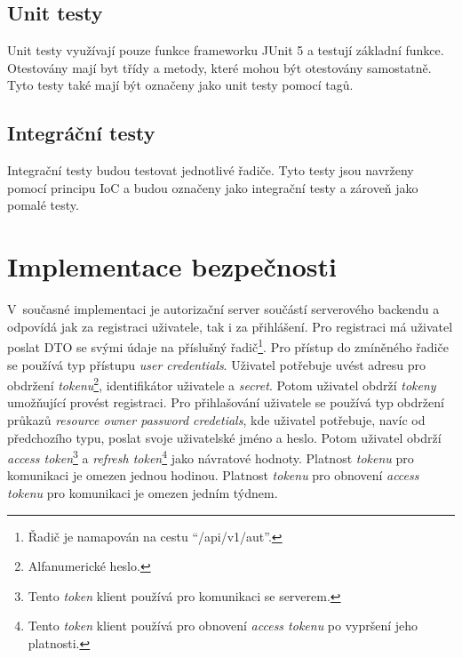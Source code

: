     \subsection{Unit testy}
        Unit testy využívají pouze funkce frameworku JUnit 5 a testují základní funkce. Otestovány mají byt třídy a metody, které mohou být otestovány samostatně. Tyto testy také mají být označeny jako unit testy pomocí tagů.
        
    \subsection{Integráční testy}
        Integrační testy budou testovat jednotlivé řadiče. Tyto testy jsou navrženy pomocí principu IoC a budou označeny jako integrační testy a zároveň jako pomalé testy.

\section{Implementace bezpečnosti}
        V~současné implementaci je autorizační server součástí serverového backendu a odpovídá jak za registraci uživatele, tak i za přihlášení. Pro registraci má uživatel poslat DTO se svými údaje na příslušný řadič\footnote{Řadič je namapován na cestu \enquote{/api/v1/aut}.}. Pro přístup do zmíněného řadiče se používá typ přístupu \textit{user credentials}. Uživatel potřebuje uvést adresu pro obdržení \textit{tokenu}\footnote{Alfanumerické heslo.}, identifikátor uživatele a \textit{secret}. Potom uživatel obdrží \textit{tokeny} umožňující provést registraci.
        Pro přihlašování uživatele se používá typ obdržení průkazů \textit{resource owner password credetials}, kde uživatel potřebuje, navíc od předchozího typu, poslat svoje uživatelské jméno a heslo. Potom uživatel obdrží \textit{access token}\footnote{Tento \textit{token} klient používá pro komunikaci se serverem.} a \textit{refresh token}\footnote{Tento \textit{token} klient používá pro obnovení \textit{access tokenu} po vypršení jeho platnosti.} jako návratové hodnoty. Platnost \textit{tokenu} pro komunikaci je omezen jednou hodinou. Platnost \textit{tokenu} pro obnovení \textit{access tokenu} pro komunikaci je omezen jedním týdnem.